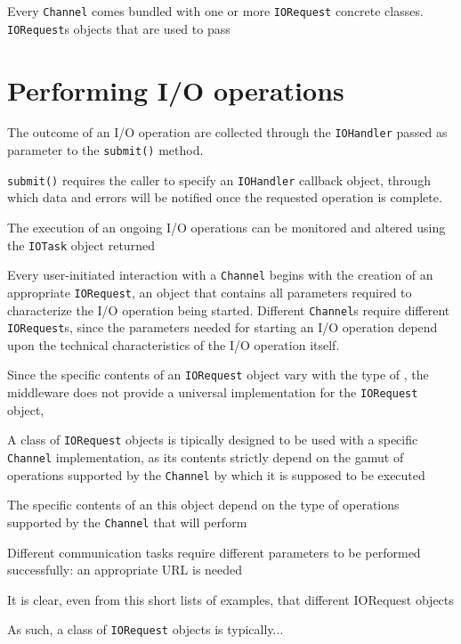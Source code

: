Every \texttt{Channel} comes bundled with one or more \texttt{IORequest} concrete classes. \texttt{IORequest}s objects that are used to pass





\section{Performing I/O operations}


The outcome of an I/O operation are collected through the \texttt{IOHandler} passed as parameter to the \texttt{submit()} method. 

\texttt{submit()} requires the caller to specify an \texttt{IOHandler} callback object, through which data and errors will be notified once the requested operation is complete.

The execution of an ongoing I/O operations can be monitored and altered using the \texttt{IOTask} object returned 






Every user-initiated interaction with a \texttt{Channel} begins with the creation of an appropriate \texttt{IORequest}, an object that contains all parameters required to characterize the I/O operation being started. Different \texttt{Channel}s require different \texttt{IORequest}s, since the parameters needed for starting an I/O operation depend upon the technical characteristics of the I/O operation itself.

Since the specific contents of an \texttt{IORequest} object vary with the type of , the middleware does not provide a universal implementation for the \texttt{IORequest} object, 


A class of \texttt{IORequest} objects is tipically designed to be used with a specific \texttt{Channel} implementation, as its contents strictly depend on the gamut of operations supported by the \texttt{Channel} by which it is supposed to be executed 

The specific contents of an this object depend on the type of operations supported by the \texttt{Channel} that will perform

Different communication tasks require different parameters to be performed successfully: an appropriate URL is needed 

It is clear, even from this short lists of examples, that different IORequest objects

As such, a class of \texttt{IORequest} objects is typically...

